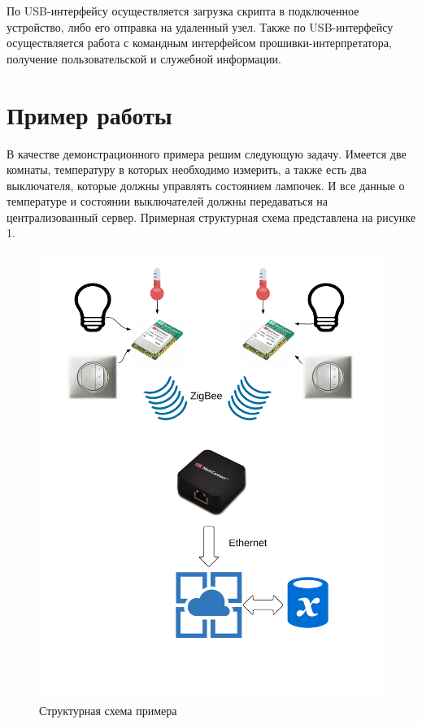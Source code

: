 \documentclass[12pt]{article}
\begin{document}
По USB-интерфейсу осуществляется загрузка скрипта в подключенное устройство, либо 
его отправка на удаленный узел. Также по USB-интерфейсу осуществляется работа с
командным интерфейсом прошивки-интерпретатора, получение пользовательской и служебной
информации.

\section{Пример работы}
В качестве демонстрационного примера решим следующую задачу. Имеется две комнаты,
температуру в которых необходимо измерить, а также есть два выключателя, которые
должны управлять состоянием лампочек. И все данные о температуре и состоянии
выключателей должны передаваться на централизованный сервер. Примерная структурная
схема представлена на рисунке 1.
\begin{figure}[h!]
    \centering
    \includegraphics[scale=0.5]{cel-structure.png}
    \caption{Структурная схема примера}
\end{figure}
\end{document}

